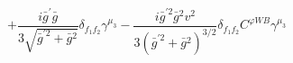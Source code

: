 %
\begin{dmath*}
%
  +  \frac{i {\bar g}^\prime {\bar g}{}}{3 \sqrt{{\bar g}^{\prime 2} + {\bar g}{}^2}}\delta_{f_1 f_2}  \gamma^{\mu_3}  -  \frac{i {\bar g}^{\prime 2} {\bar g}{}^2 v^2}{3 \left({\bar g}^{\prime 2} + {\bar g}{}^2\right)^{3/2}}\delta_{f_1 f_2}  C^{ \varphi  WB} \gamma^{\mu_3}
%
\end{dmath*}
%
